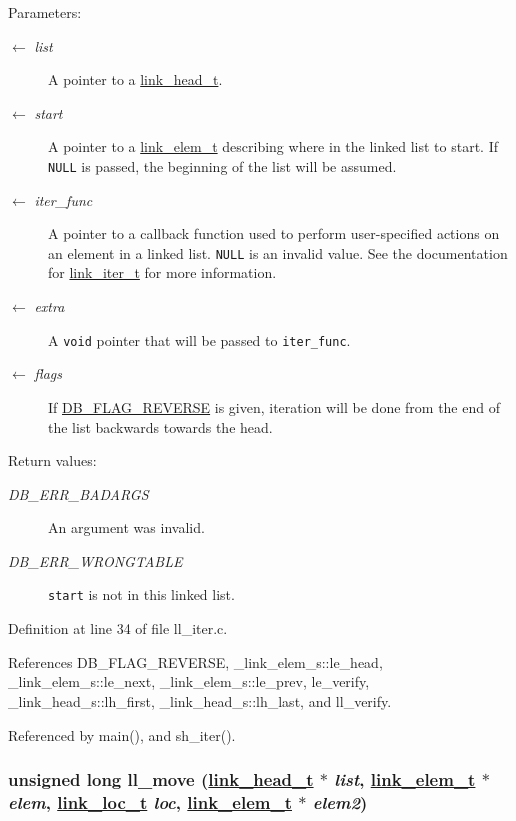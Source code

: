 \begin{Desc}
\item[Parameters:]
\begin{description}
\item[\mbox{$\leftarrow$} {\em list}]A pointer to a \hyperlink{group__dbprim__link_ga0}{link\_\-head\_\-t}. \item[\mbox{$\leftarrow$} {\em start}]A pointer to a \hyperlink{group__dbprim__link_ga1}{link\_\-elem\_\-t} describing where in the linked list to start. If {\tt NULL} is passed, the beginning of the list will be assumed. \item[\mbox{$\leftarrow$} {\em iter\_\-func}]A pointer to a callback function used to perform user-specified actions on an element in a linked list. {\tt NULL} is an invalid value. See the documentation for \hyperlink{group__dbprim__link_ga2}{link\_\-iter\_\-t} for more information. \item[\mbox{$\leftarrow$} {\em extra}]A {\tt void} pointer that will be passed to {\tt iter\_\-func}. \item[\mbox{$\leftarrow$} {\em flags}]If \hyperlink{group__dbprim_ga4}{DB\_\-FLAG\_\-REVERSE} is given, iteration will be done from the end of the list backwards towards the head.\end{description}
\end{Desc}
\begin{Desc}
\item[Return values:]
\begin{description}
\item[{\em DB\_\-ERR\_\-BADARGS}]An argument was invalid. \item[{\em DB\_\-ERR\_\-WRONGTABLE}]{\tt start} is not in this linked list.\end{description}
\end{Desc}


Definition at line 34 of file ll\_\-iter.c.

References DB\_\-FLAG\_\-REVERSE, \_\-link\_\-elem\_\-s::le\_\-head, \_\-link\_\-elem\_\-s::le\_\-next, \_\-link\_\-elem\_\-s::le\_\-prev, le\_\-verify, \_\-link\_\-head\_\-s::lh\_\-first, \_\-link\_\-head\_\-s::lh\_\-last, and ll\_\-verify.

Referenced by main(), and sh\_\-iter().\hypertarget{group__dbprim__link_ga7}{
\subsubsection[ll\_\-move]{\setlength{\rightskip}{0pt plus 5cm}unsigned long ll\_\-move (\hyperlink{struct__link__head__s}{link\_\-head\_\-t} $\ast$ {\em list}, \hyperlink{struct__link__elem__s}{link\_\-elem\_\-t} $\ast$ {\em elem}, \hyperlink{group__dbprim__link_ga4}{link\_\-loc\_\-t} {\em loc}, \hyperlink{struct__link__elem__s}{link\_\-elem\_\-t} $\ast$ {\em elem2})}}
\label{group__dbprim__link_ga7}


